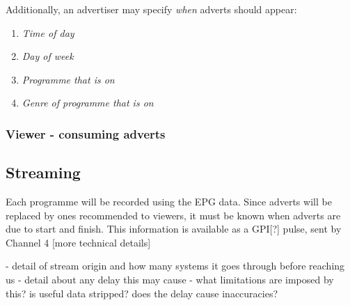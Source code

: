 Additionally, an advertiser may specify \textit{when} adverts should appear:
\begin{enumerate}
\item \textit{Time of day}
\item \textit{Day of week}
\item \textit{Programme that is on}
\item \textit{Genre of programme that is on}
\end{enumerate}

\subsubsection{Viewer - consuming adverts}

\subsection{Streaming}
Each programme will be recorded using the EPG data. Since adverts will be replaced by ones recommended to viewers, it must be known when adverts are due to start and finish. This information is available as a GPI[?] pulse, sent by Channel 4 [more technical details]

- detail of stream origin and how many systems it goes through before reaching us
- detail about any delay this may cause
- what limitations are imposed by this? is useful data stripped? does the delay cause inaccuracies?

